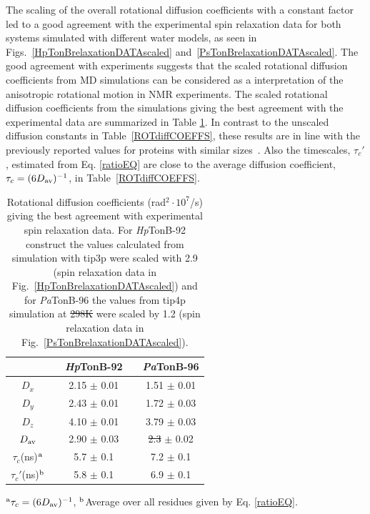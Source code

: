 \documentclass[journal=jpcbfk,manuscript=article]{achemso}
\providecommand{\DIFadd}[1]{{\protect\color{blue}\uwave{#1}}} %
\providecommand{\DIFdel}[1]{{\protect\color{red}\sout{#1}}}                      %
\providecommand{\DIFaddFL}[1]{\DIFadd{#1}} %
\providecommand{\DIFdelFL}[1]{\DIFdel{#1}} %
\providecommand{\DIFaddbeginFL}{} %
\providecommand{\DIFaddendFL}{} %
\providecommand{\DIFdelbeginFL}{} %
\providecommand{\DIFdelendFL}{} %
\begin{document}
The scaling of the overall rotational diffusion coefficients
with a constant factor led to a good agreement with the experimental
spin relaxation data for both systems simulated with different water models,
as seen in Figs.~\ref{HpTonBrelaxationDATAscaled} and~\ref{PsTonBrelaxationDATAscaled}.
The good agreement with experiments suggests that the scaled rotational diffusion coefficients
from MD simulations can be considered as a interpretation of the anisotropic rotational motion in NMR experiments.
The scaled rotational diffusion coefficients from the simulations giving the best agreement
with the experimental data are summarized in Table \ref{ROTdiffCOEFFSscaled}.
In contrast to the unscaled diffusion constants in Table~\ref{ROTdiffCOEFFS},
these results are in line with the previously reported values for proteins
with similar sizes~\cite{krishnan98}. Also the timescales, $\tau_{c}'$, estimated from 
Eq. \ref{ratioEQ} are close to the average diffusion coefficient, $\tau_{c}=(6D_{\rm av})^{-1}$,
in Table~\ref{ROTdiffCOEFFS}.
\begin{table}[!h]
  \centering
  \caption{Rotational diffusion coefficients (rad$^2\cdot 10^7$/s) giving the best agreement with experimental spin relaxation data.
    For {\it Hp}TonB-92 construct the values calculated from simulation with tip3p were scaled with 2.9
    (spin relaxation data in Fig.~\ref{HpTonBrelaxationDATAscaled}) and  for {\it Pa}TonB-96
    the values from tip4p simulation at \DIFdelbeginFL \DIFdelFL{298K }\DIFdelendFL \DIFaddbeginFL \DIFaddFL{298 K }\DIFaddendFL were scaled by 1.2 (spin relaxation data in
    Fig.~\ref{PsTonBrelaxationDATAscaled}). 
  }\label{ROTdiffCOEFFSscaled}
  \begin{tabular}{c c c c c}
    &    &  {\it Hp}TonB-92  &  & {\it Pa}TonB-96 \\
    \hline
    $D_{x}$        &    &   2.15 $\pm$ 0.01  & & 1.51  $\pm$ 0.01\\
    $D_{y}$        &    &  2.43  $\pm$ 0.01  & & 1.72  $\pm$ 0.03\\
    $D_{z}$        &    &  4.10   $\pm$ 0.01 & & 3.79  $\pm$ 0.03\\
    $D_{\rm av}$        &    &   2.90  $\pm$ 0.03  & & \DIFdelbeginFL \DIFdelFL{2.3  }\DIFdelendFL \DIFaddbeginFL \DIFaddFL{2.30  }\DIFaddendFL $\pm$ 0.02\\
    $\tau_{c}$(ns)$^{\rm a}$  &    &  5.7   $\pm$ 0.1  & & 7.2 $\pm$ 0.1 \\
    $\tau_{c}'$(ns)$^{\rm b}$  &    &  5.8   $\pm$ 0.1 & & 6.9   $\pm$ 0.1 \\
  \end{tabular}
  \newline
  \flushleft
  $^{\rm a}\tau_{c}=(6D_{\rm av})^{-1}$, $^{\rm b}$Average over all residues given by Eq. \ref{ratioEQ}.
\end{table} 
\end{document}
